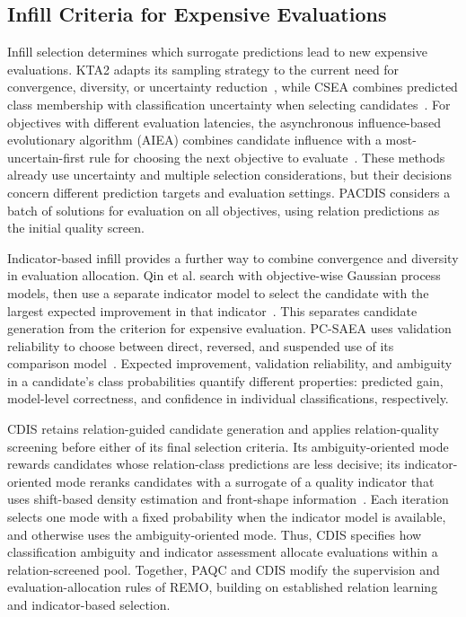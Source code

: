 \documentclass[final,5p,times,twocolumn]{elsarticle}
\begin{document}
\subsection{Infill Criteria for Expensive Evaluations}
\label{sec:related:selection}

Infill selection determines which surrogate predictions lead to new
expensive evaluations. KTA2 adapts its sampling strategy to the current need
for convergence, diversity, or uncertainty reduction~\cite{ref:kta2}, while
CSEA combines predicted class membership with classification uncertainty
when selecting candidates~\cite{ref:csea}. For objectives with different
evaluation latencies, the asynchronous influence-based evolutionary
algorithm (AIEA) combines candidate influence with a most-uncertain-first
rule for choosing the next objective to evaluate~\cite{ref:aiea}. These
methods already use uncertainty and multiple selection considerations, but
their decisions concern different prediction targets and evaluation
settings. PACDIS considers a batch of solutions for evaluation on all
objectives, using relation predictions as the initial quality screen.

Indicator-based infill provides a further way to combine convergence and
diversity in evaluation allocation. Qin et al. search with
objective-wise Gaussian process models, then use a separate indicator
model to select the candidate with the largest expected improvement in
that indicator~\cite{ref:emmoea}. This separates candidate generation from
the criterion for expensive evaluation. PC-SAEA uses validation reliability
to choose between direct, reversed,
and suspended use of its comparison model~\cite{ref:pcsaea}. Expected
improvement, validation reliability, and ambiguity in a candidate's class
probabilities quantify different properties: predicted gain, model-level
correctness, and confidence in individual classifications, respectively.

CDIS retains relation-guided candidate generation and applies relation-quality
screening before either of its final selection criteria. Its
ambiguity-oriented mode rewards candidates whose relation-class predictions
are less decisive; its indicator-oriented mode reranks candidates with a
surrogate of a quality indicator that uses shift-based density estimation
and front-shape information~\cite{ref:sde,ref:piea}. Each iteration selects
one mode with a fixed probability when the indicator model is available,
and otherwise uses the ambiguity-oriented mode. Thus, CDIS specifies how
classification ambiguity and indicator assessment allocate evaluations
within a relation-screened pool. Together, PAQC and CDIS modify the
supervision and evaluation-allocation rules of REMO, building on established
relation learning and indicator-based selection.
\end{document}
